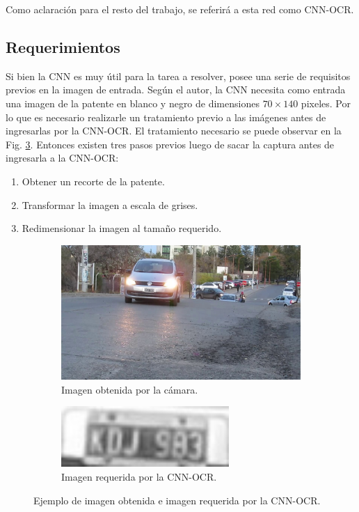 Como aclaración para el resto del trabajo, se referirá a esta red como CNN-OCR.

\subsection{Requerimientos}

Si bien la CNN es muy útil para la tarea a resolver, posee una serie de requisitos previos en la imagen de entrada. Según el autor, la CNN
necesita como entrada una imagen de la patente en blanco y negro de dimensiones $70 \times 140$ pixeles.
Por lo que es necesario realizarle un tratamiento previo a las imágenes antes de ingresarlas por la CNN-OCR. El tratamiento necesario
se puede observar en la Fig. \ref{fig:Comparativa-imagenes}. Entonces existen tres pasos previos luego de sacar
la captura antes de ingresarla a la CNN-OCR:

\begin{enumerate}
    \item Obtener un recorte de la patente.
    \item Transformar la imagen a escala de grises.
    \item Redimensionar la imagen al tamaño requerido.
\end{enumerate}
\begin{figure}[bth]
    \centering
    \begin{subfigure}[b]{0.49\textwidth}
        \centering
        \includegraphics[width=\textwidth]{imgs/imagen-obtenida.jpg}
        \caption{Imagen obtenida por la cámara.}
        \label{fig:imagen-obtenida}
    \end{subfigure}
    \hfill
    \begin{subfigure}[b]{0.49\textwidth}
        \centering
        \includegraphics[width=0.7\textwidth]{imgs/imagen-requerida.jpg}
        \caption{Imagen requerida por la CNN-OCR.}
        \label{fig:imagen-requerida}
    \end{subfigure}
    \caption{Ejemplo de imagen obtenida e imagen requerida por la CNN-OCR.}
    \label{fig:Comparativa-imagenes}
\end{figure}

